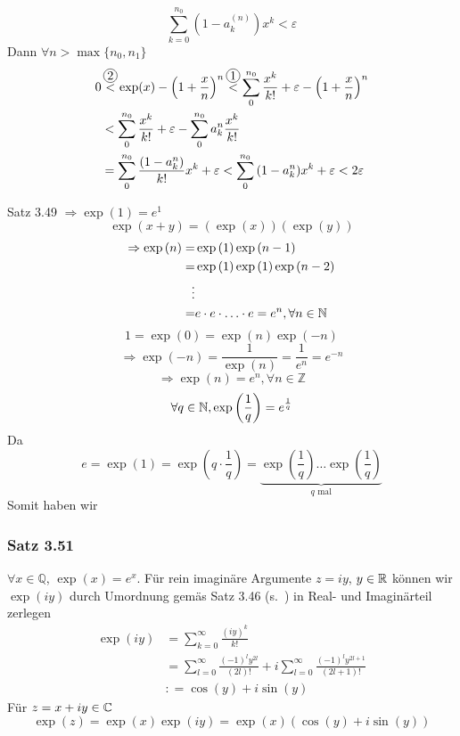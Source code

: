 \[\sum\limits_{k = 0}^{{n_0}} {\left( {1 - a_k^{(n)}} \right){x^k}}  < \varepsilon \]
Dann $\forall n>\max\{ n_0,n_1\}$
\begin{align*}
0&\mathop  < \limits^{\mycirc{2}} \exp (x) - {\left( {1 + \frac{x}{n}} \right)^n}\mathop  < \limits^{\mycirc{1}} \sum\limits_0^{{n_0}} {\frac{{{x^k}}}{{k!}}}  + \varepsilon  - {\left( {1 + \frac{x}{n}} \right)^n}\\
 &< \sum\limits_0^{{n_0}} {\frac{{{x^k}}}{{k!}}}  + \varepsilon  - \sum\limits_0^{{n_0}} {a_k^n} \frac{{{x^k}}}{{k!}}\\
 &= \sum\limits_0^{{n_0}} {\frac{{(1 - a_k^n)}}{{k!}}} {x^k} + \varepsilon  < \sum\limits_0^{{n_0}} {\left( {1 - a_k^n} \right)} {x^k} + \varepsilon  < 2\varepsilon
\end{align*}

\noindent Satz 3.49 $\Rightarrow \exp(1)=e^1$
\[\exp \left( {x + y} \right) =\left( {\exp \left( x \right)} \right)\left( {\exp \left( y \right)} \right)\]
\begin{align*}
 \Rightarrow \exp \left( n \right) =&\exp \left( 1 \right)\exp \left( {n - 1} \right)\\
 =&\exp \left( 1 \right)\exp \left( 1 \right)\exp \left( {n - 2} \right)\\
 \vdots \\
 =&e \cdot e \cdot  \ldots  \cdot e = {e^n}, \forall n\in\mathbb{N}
\end{align*}
\[1=\exp(0)=\exp(n)\exp(-n)\]
\[\Rightarrow\exp(-n)=\frac{1}{\exp(n)}=\frac{1}{e^n}=e^{-n}\]
\[\Rightarrow \exp(n)=e^n, \forall n\in\mathbb{Z}\]
\[\forall q\in\mathbb{N}, \exp\left(\frac{1}{q}\right)=e^{\frac{1}{q}}\]
Da
\[ e=\exp(1)=\exp\left(q\cdot\frac{1}{q}\right)=\underbrace {\exp \left( {\frac{1}{q}} \right) \ldots \exp \left( {\frac{1}{q}} \right)}_{q{\text{ mal}}}\]
Somit haben wir
\subsubsection*{Satz 3.51}
$\forall x\in\mathbb{Q}$, $\exp(x)=e^x$. Für rein imaginäre Argumente $z=iy$, $y\in\mathbb{R}$ können wir $\exp(iy)$ durch Umordnung gemäs Satz 3.46 (s.~\pageref{satz3.46}) in Real- und Imaginärteil zerlegen
\begin{align*}
\exp \left( {iy} \right)&= \sum\limits_{k = 0}^\infty  {\frac{{{{\left( {iy} \right)}^k}}}{{k!}}} \\
&= \sum\limits_{l = 0}^\infty  {\frac{{{{\left( { - 1} \right)}^l}{y^{2l}}}}{{\left( {2l} \right)!}}}  + i\sum\limits_{l = 0}^\infty  {\frac{{{{\left( { - 1} \right)}^l}{y^{2l + 1}}}}{{\left( {2l + 1} \right)!}}} \\
&: = \cos \left( y \right) + i\sin \left( y \right)
\end{align*}
Für $z=x+iy\in\mathbb{C}$
\[\exp \left( z \right) = \exp \left( x \right)\exp \left( {iy} \right) = \exp \left( x \right)\left( {\cos \left( y \right) + i\sin \left( y \right)} \right)\]

